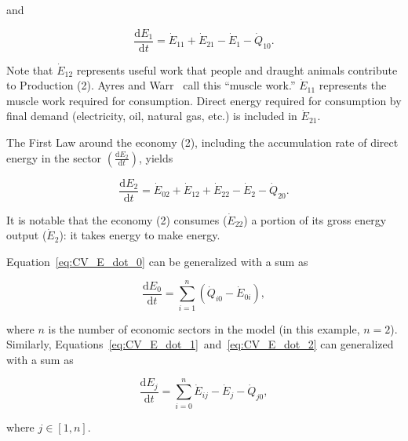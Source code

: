\noindent and 

\begin{equation} \label{eq:CV_E_dot_1}
	\frac{\mathrm{d}E_{1}}{\mathrm{d}t} 	 
	= \dot{E}_{11} 
	+ \dot{E}_{21}
	- \dot{E}_{1}
	- \dot{Q}_{10}.
\end{equation}

Note that $\dot{E}_{12}$ represents useful work that people
and draught animals contribute to Production (2). 
Ayres and Warr~\cite{Ayres:2003ec,Warr:2012cg} call this ``muscle work.'' 
$\dot{E}_{11}$ represents the muscle work required for consumption. 
Direct energy required for consumption 
by final demand (electricity, oil, natural gas, etc.)
is included in $\dot{E}_{21}$.

The First Law around the economy (2), 
including the accumulation rate of direct energy in the sector 
$\left(\frac{\mathrm{d}E_{2}}{\mathrm{d}t}\right)$, yields

\begin{equation} \label{eq:CV_E_dot_2}
	\frac{\mathrm{d}E_{2}}{\mathrm{d}t} 
	= \dot{E}_{02} 
	+ \dot{E}_{12}
	+ \dot{E}_{22} 
	- \dot{E}_{2} 
	- \dot{Q}_{20}.
\end{equation}

\noindent It is notable that the economy (2) consumes ($\dot{E}_{22}$)
a portion of its gross energy output ($\dot{E}_2$): it takes energy to make energy.

Equation~\ref{eq:CV_E_dot_0} can be generalized with a sum as

\begin{equation} \label{eq:CV_E_biosphere_general}
	\frac{\mathrm{d}E_{0}}{\mathrm{d}t} 
	= \sum\limits_{i=1}^n \left( \dot{Q}_{i0} - \dot{E}_{0i} \right),
\end{equation}

\noindent where $n$ is the number of economic sectors in the model
(in this example, $n = 2$).
Similarly, Equations~\ref{eq:CV_E_dot_1}~and~\ref{eq:CV_E_dot_2} 
can generalized with a sum as

\begin{equation} \label{eq:B-CV_E_econ_general}
	\frac{\mathrm{d}E_{j}}{\mathrm{d}t} 
	= \sum\limits_{i=0}^n\dot{E}_{ij} 
	- \dot{E}_{j}  
	- \dot{Q}_{j0},
\end{equation}

\noindent where $j \in [1, n]$.


